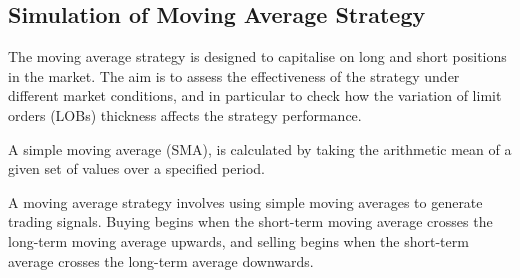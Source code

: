 \documentclass[conference]{IEEEtran}
\begin{document}




\subsection{Simulation of Moving Average Strategy}


The moving average strategy is designed to capitalise on long and short positions in the market. The aim is to assess the effectiveness of the strategy under different market conditions, and in particular to check how the variation of limit orders (LOBs) thickness affects the strategy performance.

A simple moving average (SMA), is calculated by taking the arithmetic mean of a given set of values over a specified period. 

A moving average strategy involves using simple moving averages to generate trading signals. Buying begins when the short-term moving average crosses the long-term moving average upwards, and selling begins when the short-term average crosses the long-term average downwards.
\end{document}

